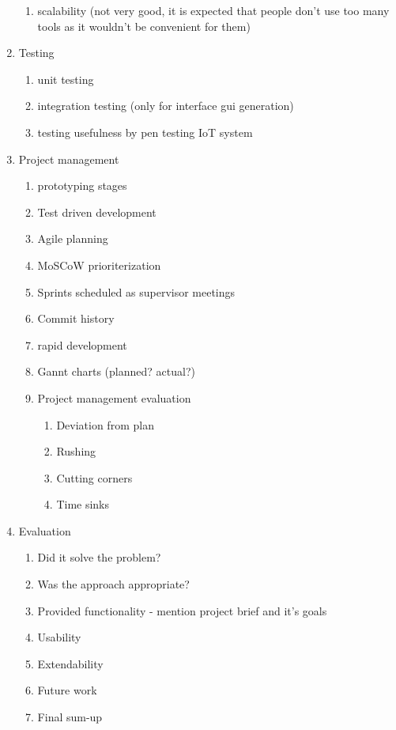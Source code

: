\begin{enumerate}
\begin{enumerate}
		\item scalability (not very good, it is expected that people don't use too many tools as it wouldn't be convenient for them)
	\end{enumerate}

	\item Testing
	\begin{enumerate}
		\item unit testing
		\item integration testing (only for interface gui generation)
		\item testing usefulness by pen testing IoT system
	\end{enumerate}

	\item Project management
	\begin{enumerate}
		\item prototyping stages
		\item Test driven development
		\item Agile planning
		\item MoSCoW prioriterization
		\item Sprints scheduled as supervisor meetings
		\item Commit history
		\item rapid development
		\item Gannt charts (planned? actual?)
		\item Project management evaluation
		\begin{enumerate}
			\item Deviation from plan
			\item Rushing
			\item Cutting corners
			\item Time sinks
		\end{enumerate}
	\end{enumerate}

	\item Evaluation
	\begin{enumerate}
		\item Did it solve the problem?
		\item Was the approach appropriate?
		\item Provided functionality - mention project brief and it's goals
		\item Usability
		\item Extendability
		\item Future work
		\item Final sum-up
	\end{enumerate}


\end{enumerate}
